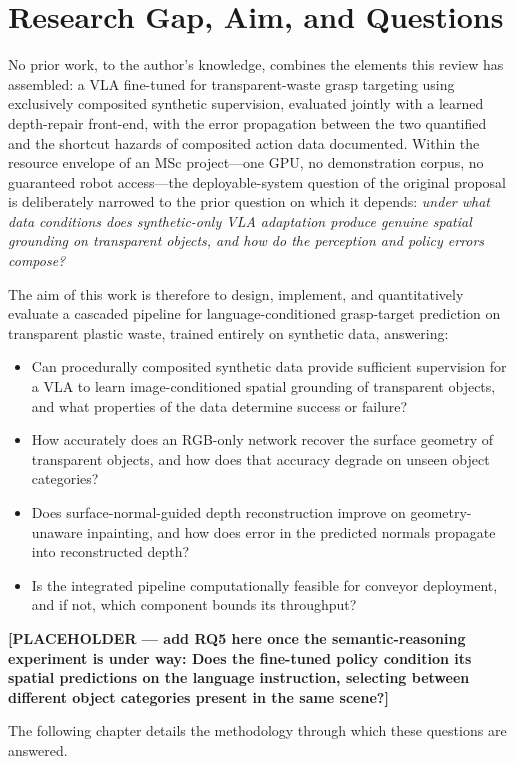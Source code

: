 \section{Research Gap, Aim, and Questions}
\label{sec:lit_aim}

No prior work, to the author's knowledge, combines the elements this review has assembled: a VLA fine-tuned for transparent-waste grasp targeting using exclusively composited synthetic supervision, evaluated jointly with a learned depth-repair front-end, with the error propagation between the two quantified and the shortcut hazards of composited action data documented. Within the resource envelope of an MSc project---one GPU, no demonstration corpus, no guaranteed robot access---the deployable-system question of the original proposal is deliberately narrowed to the prior question on which it depends: \emph{under what data conditions does synthetic-only VLA adaptation produce genuine spatial grounding on transparent objects, and how do the perception and policy errors compose?}

The aim of this work is therefore to design, implement, and quantitatively evaluate a cascaded pipeline for language-conditioned grasp-target prediction on transparent plastic waste, trained entirely on synthetic data, answering:

\begin{itemize}
    \item[\textbf{RQ1}] Can procedurally composited synthetic data provide sufficient supervision for a VLA to learn image-conditioned spatial grounding of transparent objects, and what properties of the data determine success or failure?
    \item[\textbf{RQ2}] How accurately does an RGB-only network recover the surface geometry of transparent objects, and how does that accuracy degrade on unseen object categories?
    \item[\textbf{RQ3}] Does surface-normal-guided depth reconstruction improve on geometry-unaware inpainting, and how does error in the predicted normals propagate into reconstructed depth?
    \item[\textbf{RQ4}] Is the integrated pipeline computationally feasible for conveyor deployment, and if not, which component bounds its throughput?
\end{itemize}

\textbf{[PLACEHOLDER --- add RQ5 here once the semantic-reasoning experiment is under way: Does the fine-tuned policy condition its spatial predictions on the language instruction, selecting between different object categories present in the same scene?]}

The following chapter details the methodology through which these questions are answered.
